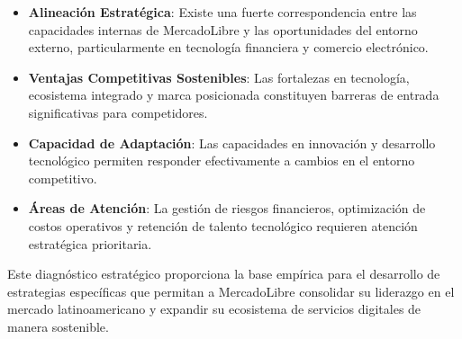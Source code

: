 \begin{itemize}
\item \textbf{Alineación Estratégica}: Existe una fuerte correspondencia entre las capacidades internas de MercadoLibre y las oportunidades del entorno externo, particularmente en tecnología financiera y comercio electrónico.
\item \textbf{Ventajas Competitivas Sostenibles}: Las fortalezas en tecnología, ecosistema integrado y marca posicionada constituyen barreras de entrada significativas para competidores.
\item \textbf{Capacidad de Adaptación}: Las capacidades en innovación y desarrollo tecnológico permiten responder efectivamente a cambios en el entorno competitivo.
\item \textbf{Áreas de Atención}: La gestión de riesgos financieros, optimización de costos operativos y retención de talento tecnológico requieren atención estratégica prioritaria.
\end{itemize}

Este diagnóstico estratégico proporciona la base empírica para el desarrollo de estrategias específicas que permitan a MercadoLibre consolidar su liderazgo en el mercado latinoamericano y expandir su ecosistema de servicios digitales de manera sostenible.
